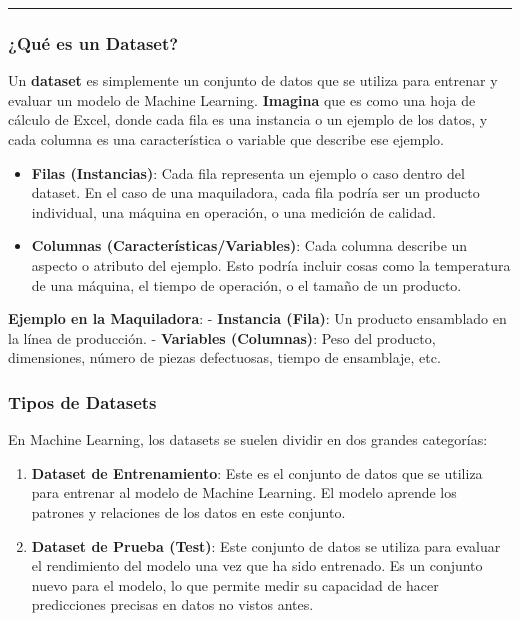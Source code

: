\documentclass[
  10pt,
  letterpaper,
]{book}
\providecommand{\tightlist}{%
  \setlength{\itemsep}{0pt}\setlength{\parskip}{0pt}}\usepackage{longtable,booktabs,array}
\begin{document}
\begin{center}\rule{0.5\linewidth}{0.5pt}\end{center}

\subsubsection{¿Qué es un Dataset?}\label{quuxe9-es-un-dataset}

Un \textbf{dataset} es simplemente un conjunto de datos que se utiliza
para entrenar y evaluar un modelo de Machine Learning. \textbf{Imagina}
que es como una hoja de cálculo de Excel, donde cada fila es una
instancia o un ejemplo de los datos, y cada columna es una
característica o variable que describe ese ejemplo.

\begin{itemize}
\tightlist
\item
  \textbf{Filas (Instancias)}: Cada fila representa un ejemplo o caso
  dentro del dataset. En el caso de una maquiladora, cada fila podría
  ser un producto individual, una máquina en operación, o una medición
  de calidad.
\item
  \textbf{Columnas (Características/Variables)}: Cada columna describe
  un aspecto o atributo del ejemplo. Esto podría incluir cosas como la
  temperatura de una máquina, el tiempo de operación, o el tamaño de un
  producto.
\end{itemize}

\textbf{Ejemplo en la Maquiladora}: - \textbf{Instancia (Fila)}: Un
producto ensamblado en la línea de producción. - \textbf{Variables
(Columnas)}: Peso del producto, dimensiones, número de piezas
defectuosas, tiempo de ensamblaje, etc.

\subsubsection{Tipos de Datasets}\label{tipos-de-datasets}

En Machine Learning, los datasets se suelen dividir en dos grandes
categorías:

\begin{enumerate}
\def\labelenumi{\arabic{enumi}.}
\item
  \textbf{Dataset de Entrenamiento}: Este es el conjunto de datos que se
  utiliza para entrenar al modelo de Machine Learning. El modelo aprende
  los patrones y relaciones de los datos en este conjunto.
\item
  \textbf{Dataset de Prueba (Test)}: Este conjunto de datos se utiliza
  para evaluar el rendimiento del modelo una vez que ha sido entrenado.
  Es un conjunto nuevo para el modelo, lo que permite medir su capacidad
  de hacer predicciones precisas en datos no vistos antes.
\end{enumerate}
\end{document}
